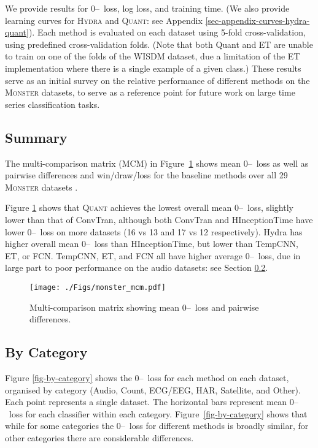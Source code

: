 \documentclass[twoside,11pt,preprint]{article}
\newcommand{\monster}{\textsc{Monster}}
\newcommand{\zo}{\mbox{0--\!1}~loss}
\newcommand{\quant}{\textsc{Quant}}
\newcommand{\hydra}{\textsc{Hydra}}
\begin{document}
We provide results for {\zo}, log loss, and training time. (We also provide learning curves for {\hydra} and {\quant}: see Appendix \ref{sec-appendix-curves-hydra-quant}). Each method is evaluated on each dataset using 5-fold cross-validation, using predefined cross-validation folds. (Note that both Quant and ET are unable to train on one of the folds of the WISDM dataset, due a limitation of the ET implementation where there is a single example of a given class.)  These results serve as an initial survey on the relative performance of different methods on the {\monster} datasets, to serve as a reference point for future work on large time series classification tasks.

\subsection{Summary}

The multi-comparison matrix (MCM) in Figure~\ref{fig-mcm} shows mean {\zo} as well as pairwise differences and win/draw/loss for the baseline methods over all 29 {\monster} datasets \citep[see][]{ismailfawaz_etal_2023b}.

Figure \ref{fig-mcm} shows that {\quant} achieves the lowest overall mean {\zo}, slightly lower than that of ConvTran, although both ConvTran and HInceptionTime have lower {\zo} on more datasets (16 vs 13 and 17 vs 12 respectively). Hydra has higher overall mean {\zo} than HInceptionTime, but lower than TempCNN, ET, or FCN. TempCNN, ET, and FCN all have higher average {\zo}, due in large part to poor performance on the audio datasets: see Section \ref{subsection-by-category}.

\begin{figure}%
    \centering%
    \texttt{[image: ./Figs/monster\_mcm.pdf]}%
    \caption{Multi-comparison matrix showing mean {\zo} and pairwise differences.}%
    \label{fig-mcm}%
\end{figure}%

\subsection{By Category} \label{subsection-by-category}

Figure \ref{fig-by-category} shows the {\zo} for each method on each dataset, organised by category (Audio, Count, ECG/EEG, HAR, Satellite, and Other). Each point represents a single dataset. The horizontal bars represent mean {\zo} for each classifier within each category. Figure~\ref{fig-by-category} shows that while for some categories the {\zo} for different methods is broadly similar, for other categories there are considerable differences.
\end{document}
